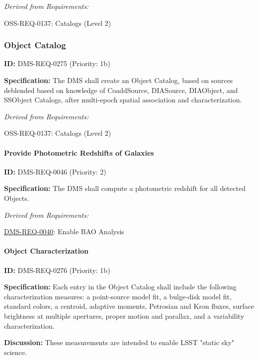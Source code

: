 \documentclass[SE,toc,lsstdraft]{lsstdoc}
\begin{document}
\emph{Derived from Requirements:}

OSS-REQ-0137:
Catalogs (Level 2) \newline

\subsubsection{Object Catalog}

\label{DMS-REQ-0275}
\textbf{ID:} DMS-REQ-0275 (Priority: 1b)

\textbf{Specification:} The DMS shall create an Object Catalog, based on sources deblended based on knowledge of CoaddSource, DIASource, DIAObject, and SSObject Catalogs, after multi-epoch spatial association and characterization.

\emph{Derived from Requirements:}

OSS-REQ-0137:
Catalogs (Level 2) \newline

\paragraph{Provide Photometric Redshifts of Galaxies}\hfill  %

\label{DMS-REQ-0046}
\textbf{ID:} DMS-REQ-0046 (Priority: 2)

\textbf{Specification:} The DMS shall compute a photometric redshift for all detected Objects.

\emph{Derived from Requirements:}

\hyperref[DMS-REQ-0040]{DMS-REQ-0040}:
Enable BAO Analysis \newline

\paragraph{Object Characterization}\hfill  %

\label{DMS-REQ-0276}
\textbf{ID:} DMS-REQ-0276 (Priority: 1b)

\textbf{Specification:} Each entry in the Object Catalog shall include the following characterization measures: a point-source model fit, a bulge-disk model fit, standard colors, a centroid, adaptive moments, Petrosian and Kron fluxes, surface brightness at multiple apertures, proper motion and parallax, and a variability characterization.

\textbf{Discussion: }These measurements are intended to enable LSST "static sky" science.
\end{document}
